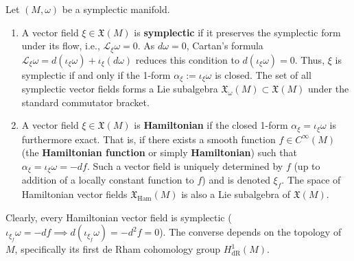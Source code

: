 \begin{definition}
Let $(M, \omega)$ be a symplectic manifold.
\begin{enumerate}
    \item A vector field $\xi \in \mathfrak{X}(M)$ is \textbf{symplectic} if it preserves the symplectic form under its flow, i.e., $\mathcal{L}_\xi \omega = 0$. As $d\omega = 0$, Cartan's formula $\mathcal{L}_\xi \omega = d(\iota_\xi \omega) + \iota_\xi(d\omega)$ reduces this condition to $d(\iota_\xi \omega) = 0$. Thus, $\xi$ is symplectic if and only if the 1-form $\alpha_\xi := \iota_\xi \omega$ is closed. The set of all symplectic vector fields forms a Lie subalgebra $\mathfrak{X}_{\omega}(M) \subset \mathfrak{X}(M)$ under the standard commutator bracket.
    \item A vector field $\xi \in \mathfrak{X}(M)$ is \textbf{Hamiltonian} if the closed 1-form $\alpha_\xi = \iota_\xi \omega$ is furthermore exact. That is, if there exists a smooth function $f \in C^\infty(M)$ (the \textbf{Hamiltonian function} or simply \textbf{Hamiltonian}) such that $\alpha_\xi = \iota_\xi \omega = -df$. Such a vector field is uniquely determined by $f$ (up to addition of a locally constant function to $f$) and is denoted $\xi_f$. The space of Hamiltonian vector fields $\mathfrak{X}_{\mathrm{Ham}}(M)$ is also a Lie subalgebra of $\mathfrak{X}(M)$.
\end{enumerate}
\end{definition}

Clearly, every Hamiltonian vector field is symplectic ($\iota_{\xi_f}\omega = -df \implies d(\iota_{\xi_f}\omega) = -d^2f = 0$). The converse depends on the topology of $M$, specifically its first de Rham cohomology group $H^1_{\text{dR}}(M)$.

